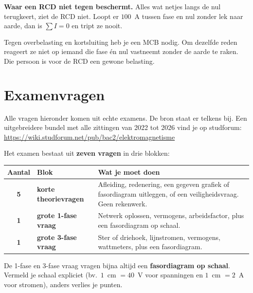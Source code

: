 \documentclass[a4paper,11pt]{article}
\begin{document}
\textbf{Waar een RCD niet tegen beschermt.} Alles wat netjes langs de nul terugkeert, ziet de RCD
niet. Loopt er $100$~A tussen fase en nul zonder lek naar aarde, dan is $\sum I = 0$ en tript ze
nooit.

Tegen overbelasting en kortsluiting heb je een MCB nodig. Om dezelfde reden reageert ze niet
op iemand die fase \'en nul vastneemt zonder de aarde te raken. Die persoon is voor de RCD een
gewone belasting.



\section{Examenvragen}

Alle vragen hieronder komen uit echte examens. De bron staat er telkens bij.
Een uitgebreidere bundel met alle zittingen van 2022 tot 2026 vind je op studforum:
\url{https://wiki.studforum.net/pub/bac2/elektromagnetisme}

\begin{examenbox}
    Het examen bestaat uit \textbf{zeven vragen} in drie blokken:

    \begin{center}
        \begin{tabular}{@{}clp{62mm}@{}}
            \toprule
            \textbf{Aantal} & \textbf{Blok}                 & \textbf{Wat je moet doen}                                                     \\
            \midrule
            \textbf{5}      & \textbf{korte theorievragen}  & Afleiding, redenering, een gegeven grafiek of fasordiagram uitleggen, of een
            veiligheidsvraag. Geen rekenwerk.                                                                                               \\[1mm]
            \textbf{1}      & \textbf{grote 1-fase vraag}   & Netwerk oplossen, vermogens, arbeidsfactor, plus een fasordiagram op schaal.  \\[1mm]
            \textbf{1}      & \textbf{grote 3-fase vraag}   & Ster of driehoek, lijnstromen, vermogens, wattmeters, plus een fasordiagram.  \\
            \bottomrule
        \end{tabular}
    \end{center}

    De 1-fase en 3-fase vraag vragen bijna altijd een \textbf{fasordiagram op schaal}. Vermeld je
    schaal expliciet (bv.\ $1$~cm $=40$~V voor spanningen en $1$~cm $=2$~A voor stromen), anders
    verlies je punten.
\end{examenbox}
\end{document}
